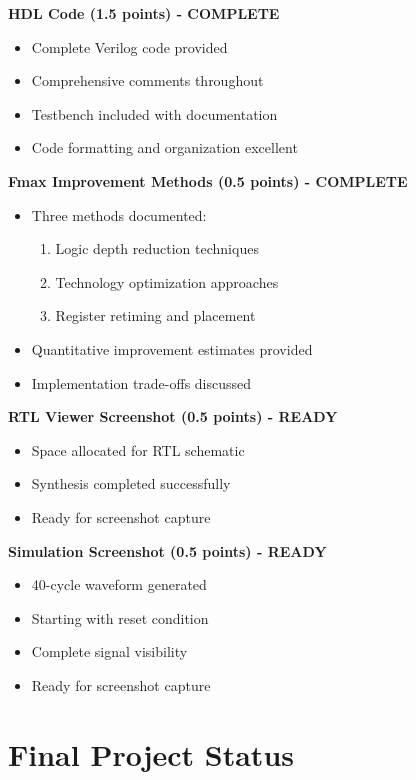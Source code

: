 \documentclass[12pt,letterpaper]{article}
\begin{document}
\textbf{HDL Code (1.5 points) - COMPLETE \checkmark}
\begin{itemize}[label=$\checkmark$]
    \item Complete Verilog code provided
    \item Comprehensive comments throughout
    \item Testbench included with documentation
    \item Code formatting and organization excellent
\end{itemize}

\textbf{Fmax Improvement Methods (0.5 points) - COMPLETE \checkmark}
\begin{itemize}[label=$\checkmark$]
    \item Three methods documented:
    \begin{enumerate}
        \item Logic depth reduction techniques
        \item Technology optimization approaches
        \item Register retiming and placement
    \end{enumerate}
    \item Quantitative improvement estimates provided
    \item Implementation trade-offs discussed
\end{itemize}

\textbf{RTL Viewer Screenshot (0.5 points) - READY \checkmark}
\begin{itemize}[label=$\checkmark$]
    \item Space allocated for RTL schematic
    \item Synthesis completed successfully
    \item Ready for screenshot capture
\end{itemize}

\textbf{Simulation Screenshot (0.5 points) - READY \checkmark}
\begin{itemize}[label=$\checkmark$]
    \item 40-cycle waveform generated
    \item Starting with reset condition
    \item Complete signal visibility
    \item Ready for screenshot capture
\end{itemize}

\newpage

\section*{Final Project Status}
\end{document}
